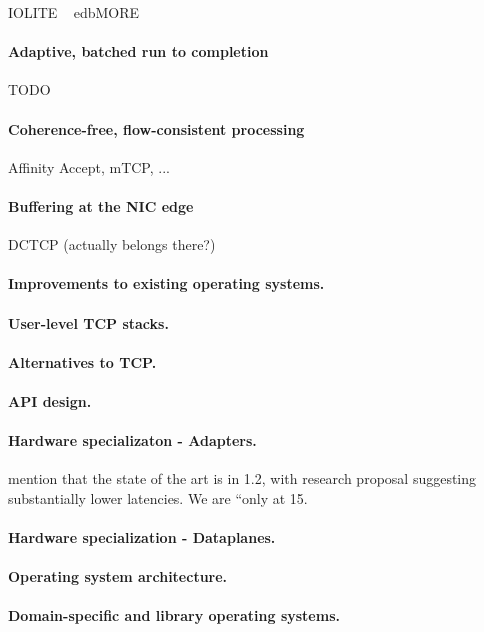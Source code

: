 \todo IOLITE ~\cite{DBLP:journals/tocs/PaiDZ00}
\todo edb{MORE}

\paragraph{Adaptive, batched run to completion}

\todo TODO

\paragraph{Coherence-free, flow-consistent processing}

\todo Affinity Accept, mTCP, ...

\paragraph{Buffering at the NIC edge}

\todo DCTCP (actually belongs there?)


\paragraph{Improvements to existing operating systems.}

\paragraph{User-level TCP stacks.}

\paragraph{Alternatives to TCP.}

\paragraph{API design.}

\paragraph{Hardware specializaton - Adapters.}

\todo mention that the state of the art is in 1.2\microsecond, with research proposal suggesting substantially lower latencies.   We are ``only at 15\microsecond. 

\paragraph{Hardware specialization - Dataplanes.}

\paragraph{Operating system architecture.}

\paragraph{Domain-specific and library operating systems.}
